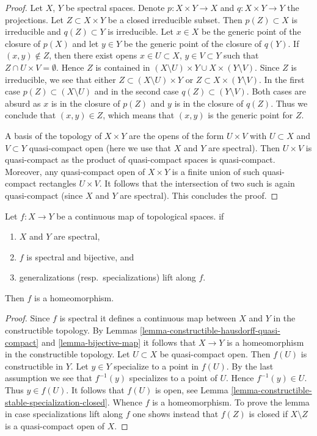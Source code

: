 \begin{proof}
Let $X$, $Y$ be spectral spaces. Denote $p : X \times Y \to X$ and
$q : X \times Y \to Y$ the projections. Let $Z \subset X \times Y$ be a
closed irreducible subset. Then $p(Z) \subset X$ is irreducible
and $q(Z) \subset Y$ is irreducible. Let $x \in X$ be the generic
point of the closure of $p(X)$ and let $y \in Y$ be the generic
point of the closure of $q(Y)$. If $(x, y) \not \in Z$, then
there exist opens $x \in U \subset X$, $y \in V \subset Y$ such
that $Z \cap U \times V = \emptyset$. Hence $Z$ is contained
in $(X \setminus U) \times Y \cup X \times (Y \setminus V)$.
Since $Z$ is irreducible, we see that either
$Z \subset (X \setminus U) \times Y$ or $Z \subset X \times (Y \setminus V)$.
In the first case $p(Z) \subset (X \setminus U)$ and in the
second case $q(Z) \subset (Y \setminus V)$. Both cases are absurd
as $x$ is in the closure of $p(Z)$ and $y$ is in the closure of
$q(Z)$. Thus we conclude that $(x, y) \in Z$, which means that
$(x, y)$ is the generic point for $Z$.

\medskip\noindent
A basis of the topology of $X \times Y$ are the opens of the form
$U \times V$ with $U \subset X$ and $V \subset Y$ quasi-compact open
(here we use that $X$ and $Y$ are spectral). Then $U \times V$ is
quasi-compact as the product of quasi-compact spaces is quasi-compact.
Moreover, any quasi-compact open of $X \times Y$ is a finite union
of such quasi-compact rectangles $U \times V$. It follows that
the intersection of two such is again quasi-compact
(since $X$ and $Y$ are spectral). This concludes the proof.
\end{proof}

\begin{lemma}
\label{lemma-spectral-bijective}
Let $f : X \to Y$ be a continuous map of topological spaces. if
\begin{enumerate}
\item $X$ and $Y$ are spectral,
\item $f$ is spectral and bijective, and
\item generalizations (resp.\ specializations) lift along $f$.
\end{enumerate}
Then $f$ is a homeomorphism.
\end{lemma}

\begin{proof}
Since $f$ is spectral it defines a continuous map between $X$ and $Y$ in
the constructible topology. By
Lemmas \ref{lemma-constructible-hausdorff-quasi-compact} and
\ref{lemma-bijective-map}
it follows that $X \to Y$ is a homeomorphism in the constructible
topology. Let $U \subset X$ be quasi-compact open.
Then $f(U)$ is constructible in $Y$. Let $y \in Y$ specialize
to a point in $f(U)$. By the last assumption we see that $f^{-1}(y)$
specializes to a point of $U$. Hence $f^{-1}(y) \in U$. Thus $y \in f(U)$.
It follows that $f(U)$ is open, see
Lemma \ref{lemma-constructible-stable-specialization-closed}.
Whence $f$ is a homeomorphism.
To prove the lemma in case specializations lift along $f$
one shows instead that $f(Z)$ is closed if $X \setminus Z$ is a
quasi-compact open of $X$.
\end{proof}

